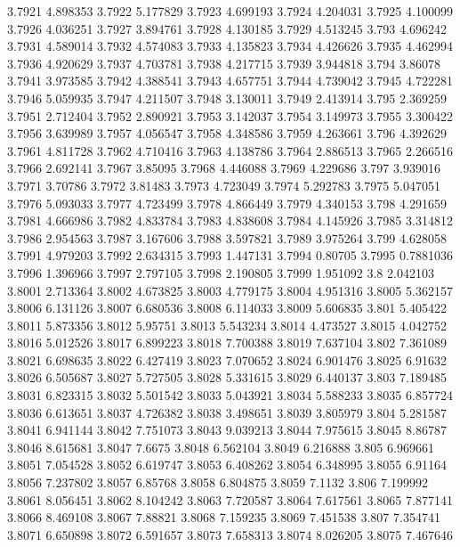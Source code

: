 3.7921  4.898353
3.7922  5.177829
3.7923  4.699193
3.7924  4.204031
3.7925  4.100099
3.7926  4.036251
3.7927  3.894761
3.7928  4.130185
3.7929  4.513245
3.793  4.696242
3.7931  4.589014
3.7932  4.574083
3.7933  4.135823
3.7934  4.426626
3.7935  4.462994
3.7936  4.920629
3.7937  4.703781
3.7938  4.217715
3.7939  3.944818
3.794  3.86078
3.7941  3.973585
3.7942  4.388541
3.7943  4.657751
3.7944  4.739042
3.7945  4.722281
3.7946  5.059935
3.7947  4.211507
3.7948  3.130011
3.7949  2.413914
3.795  2.369259
3.7951  2.712404
3.7952  2.890921
3.7953  3.142037
3.7954  3.149973
3.7955  3.300422
3.7956  3.639989
3.7957  4.056547
3.7958  4.348586
3.7959  4.263661
3.796  4.392629
3.7961  4.811728
3.7962  4.710416
3.7963  4.138786
3.7964  2.886513
3.7965  2.266516
3.7966  2.692141
3.7967  3.85095
3.7968  4.446088
3.7969  4.229686
3.797  3.939016
3.7971  3.70786
3.7972  3.81483
3.7973  4.723049
3.7974  5.292783
3.7975  5.047051
3.7976  5.093033
3.7977  4.723499
3.7978  4.866449
3.7979  4.340153
3.798  4.291659
3.7981  4.666986
3.7982  4.833784
3.7983  4.838608
3.7984  4.145926
3.7985  3.314812
3.7986  2.954563
3.7987  3.167606
3.7988  3.597821
3.7989  3.975264
3.799  4.628058
3.7991  4.979203
3.7992  2.634315
3.7993  1.447131
3.7994  0.80705
3.7995  0.7881036
3.7996  1.396966
3.7997  2.797105
3.7998  2.190805
3.7999  1.951092
3.8  2.042103
3.8001  2.713364
3.8002  4.673825
3.8003  4.779175
3.8004  4.951316
3.8005  5.362157
3.8006  6.131126
3.8007  6.680536
3.8008  6.114033
3.8009  5.606835
3.801  5.405422
3.8011  5.873356
3.8012  5.95751
3.8013  5.543234
3.8014  4.473527
3.8015  4.042752
3.8016  5.012526
3.8017  6.899223
3.8018  7.700388
3.8019  7.637104
3.802  7.361089
3.8021  6.698635
3.8022  6.427419
3.8023  7.070652
3.8024  6.901476
3.8025  6.91632
3.8026  6.505687
3.8027  5.727505
3.8028  5.331615
3.8029  6.440137
3.803  7.189485
3.8031  6.823315
3.8032  5.501542
3.8033  5.043921
3.8034  5.588233
3.8035  6.857724
3.8036  6.613651
3.8037  4.726382
3.8038  3.498651
3.8039  3.805979
3.804  5.281587
3.8041  6.941144
3.8042  7.751073
3.8043  9.039213
3.8044  7.975615
3.8045  8.86787
3.8046  8.615681
3.8047  7.6675
3.8048  6.562104
3.8049  6.216888
3.805  6.969661
3.8051  7.054528
3.8052  6.619747
3.8053  6.408262
3.8054  6.348995
3.8055  6.91164
3.8056  7.237802
3.8057  6.85768
3.8058  6.804875
3.8059  7.1132
3.806  7.199992
3.8061  8.056451
3.8062  8.104242
3.8063  7.720587
3.8064  7.617561
3.8065  7.877141
3.8066  8.469108
3.8067  7.88821
3.8068  7.159235
3.8069  7.451538
3.807  7.354741
3.8071  6.650898
3.8072  6.591657
3.8073  7.658313
3.8074  8.026205
3.8075  7.467646
